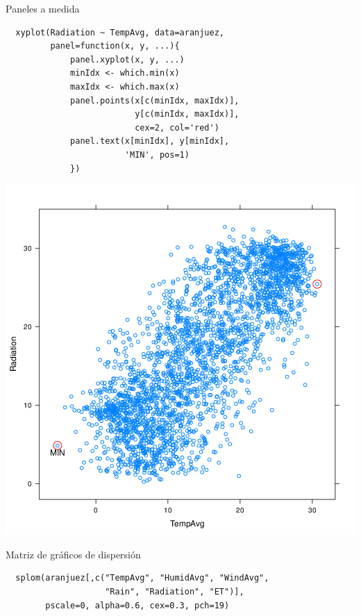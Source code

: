 \documentclass[xcolor={usenames,svgnames,dvipsnames}]{beamer}
\begin{document}
\begin{frame}[fragile,label=sec-3-28]{Paneles a medida}
 \lstset{language=R,label= ,caption= ,numbers=none}
\begin{lstlisting}
  xyplot(Radiation ~ TempAvg, data=aranjuez,
         panel=function(x, y, ...){
             panel.xyplot(x, y, ...)
             minIdx <- which.min(x)
             maxIdx <- which.max(x)
             panel.points(x[c(minIdx, maxIdx)],
                          y[c(minIdx, maxIdx)],
                          cex=2, col='red')
             panel.text(x[minIdx], y[minIdx],
                        'MIN', pos=1)
             })
\end{lstlisting}
\end{frame}

\begin{frame}[label=sec-3-29]{}
\includegraphics[width=.9\linewidth]{figs/panel.png}
\end{frame}

\begin{frame}[fragile,label=sec-3-30]{Matriz de gráficos de dispersión}
 \lstset{language=R,label= ,caption= ,numbers=none}
\begin{lstlisting}
  splom(aranjuez[,c("TempAvg", "HumidAvg", "WindAvg",
                    "Rain", "Radiation", "ET")],
        pscale=0, alpha=0.6, cex=0.3, pch=19)
\end{lstlisting}
\end{frame}
\end{document}
